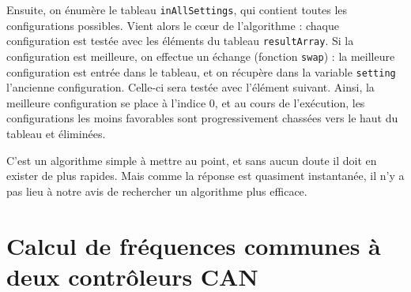 Ensuite, on énumère le tableau \texttt{inAllSettings}, qui contient toutes les configurations possibles. Vient alors le cœur de l'algorithme : chaque configuration est testée avec les éléments du tableau \texttt{resultArray}. Si la configuration est meilleure, on effectue un échange (fonction \texttt{swap}) : la meilleure configuration est entrée dans le tableau, et on récupère dans la variable \texttt{setting} l'ancienne configuration. Celle-ci sera testée avec l'élément suivant. Ainsi, la meilleure configuration se place à l'indice $0$, et au cours de l'exécution, les configurations les moins favorables sont progressivement chassées vers le haut du tableau et éliminées.

C'est un algorithme simple à mettre au point, et sans aucun doute il doit en exister de plus rapides. Mais comme la réponse est quasiment instantanée, il n'y a pas lieu à notre avis de rechercher un algorithme plus efficace.


\section{Calcul de fréquences communes à deux contrôleurs CAN}



